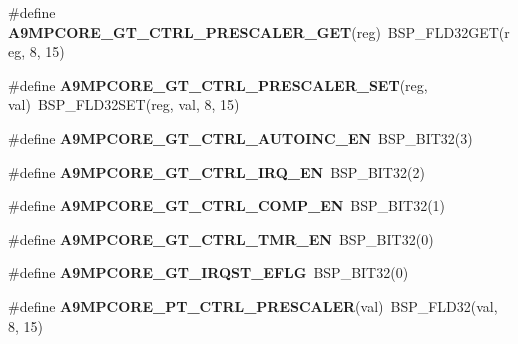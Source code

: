 \begin{DoxyCompactItemize}
\item 
\mbox{\label{arm-a9mpcore-regs_8h_af1437dd921238f8b27b83d04df69ffe0}} 
\#define {\bfseries A9\+M\+P\+C\+O\+R\+E\+\_\+\+G\+T\+\_\+\+C\+T\+R\+L\+\_\+\+P\+R\+E\+S\+C\+A\+L\+E\+R\+\_\+\+G\+ET}(reg)~B\+S\+P\+\_\+\+F\+L\+D32\+G\+ET(reg, 8, 15)
\item 
\mbox{\label{arm-a9mpcore-regs_8h_a49c61dff2aa7599834347ab3f8494125}} 
\#define {\bfseries A9\+M\+P\+C\+O\+R\+E\+\_\+\+G\+T\+\_\+\+C\+T\+R\+L\+\_\+\+P\+R\+E\+S\+C\+A\+L\+E\+R\+\_\+\+S\+ET}(reg,  val)~B\+S\+P\+\_\+\+F\+L\+D32\+S\+ET(reg, val, 8, 15)
\item 
\mbox{\label{arm-a9mpcore-regs_8h_a93cf2b86fe8a96cea0716de3097514a6}} 
\#define {\bfseries A9\+M\+P\+C\+O\+R\+E\+\_\+\+G\+T\+\_\+\+C\+T\+R\+L\+\_\+\+A\+U\+T\+O\+I\+N\+C\+\_\+\+EN}~B\+S\+P\+\_\+\+B\+I\+T32(3)
\item 
\mbox{\label{arm-a9mpcore-regs_8h_a1eacf7a5bf2294e75bb7462f72061a84}} 
\#define {\bfseries A9\+M\+P\+C\+O\+R\+E\+\_\+\+G\+T\+\_\+\+C\+T\+R\+L\+\_\+\+I\+R\+Q\+\_\+\+EN}~B\+S\+P\+\_\+\+B\+I\+T32(2)
\item 
\mbox{\label{arm-a9mpcore-regs_8h_ae9e12605bf5e50f6087677c3228b4bcc}} 
\#define {\bfseries A9\+M\+P\+C\+O\+R\+E\+\_\+\+G\+T\+\_\+\+C\+T\+R\+L\+\_\+\+C\+O\+M\+P\+\_\+\+EN}~B\+S\+P\+\_\+\+B\+I\+T32(1)
\item 
\mbox{\label{arm-a9mpcore-regs_8h_a20b1d9f679f727a2116a4132048ca594}} 
\#define {\bfseries A9\+M\+P\+C\+O\+R\+E\+\_\+\+G\+T\+\_\+\+C\+T\+R\+L\+\_\+\+T\+M\+R\+\_\+\+EN}~B\+S\+P\+\_\+\+B\+I\+T32(0)
\item 
\mbox{\label{arm-a9mpcore-regs_8h_af839d443f25d86157e323f3023ededfc}} 
\#define {\bfseries A9\+M\+P\+C\+O\+R\+E\+\_\+\+G\+T\+\_\+\+I\+R\+Q\+S\+T\+\_\+\+E\+F\+LG}~B\+S\+P\+\_\+\+B\+I\+T32(0)
\item 
\mbox{\label{arm-a9mpcore-regs_8h_a507e9bb5b399b6573ab835c033041b73}} 
\#define {\bfseries A9\+M\+P\+C\+O\+R\+E\+\_\+\+P\+T\+\_\+\+C\+T\+R\+L\+\_\+\+P\+R\+E\+S\+C\+A\+L\+ER}(val)~B\+S\+P\+\_\+\+F\+L\+D32(val, 8, 15)

\end{DoxyCompactItemize}

